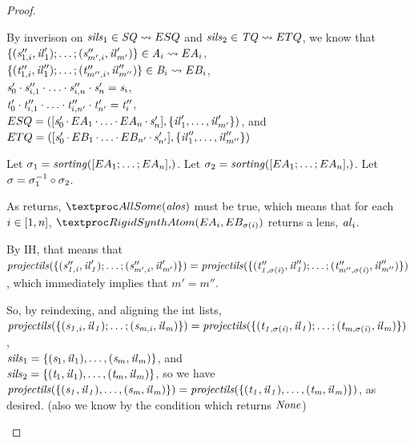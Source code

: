 \documentclass[acmsmall]{acmart}
\begin{document}
\begin{proof}
\begin{case}[sequence]
    By inverison on 
    $\mathit{sils}_1 \in \mathit{SQ} \rightsquigarrow ESQ$ and
    $\mathit{sils}_2 \in \mathit{TQ} \rightsquigarrow ETQ$,
    we know that\\
    $\{(\mathit{s}_{1,i}'',\mathit{il}_1');\ldots;(\mathit{s}_{m',i}'',\mathit{il}_{m'}')\}
    \in \mathit{A}_i \rightsquigarrow EA_i$,\\
    $\{(\mathit{t}_{1,i}'',\mathit{il}_1'');\ldots;(\mathit{t}_{m'',i}'',\mathit{il}_{m''}'')\}
    \in \mathit{B}_i \rightsquigarrow EB_i$,\\
    $\mathit{s}_0'\cdot\mathit{s}_{i,1}''\cdot\ldots\cdot\mathit{s}_{i,n}''\cdot\mathit{s}_n' = \mathit{s}_i$,\\
    $\mathit{t}_0'\cdot\mathit{t}_{i,1}''\cdot\ldots\cdot\mathit{t}_{i,n'}''\cdot\mathit{t}_{n'}' = \mathit{t}_i''$,\\
    $ESQ =
    ([\mathit{s}_0' \mkern-1mu\cdot\mkern-1mu EA_1 \mkern-1mu\cdot\mkern-1mu \ldots \mkern-1mu\cdot\mkern-1mu
      EA_n \mkern-1mu\cdot\mkern-1mu \mathit{s}_n'],\{\mathit{il}_1',\ldots,\mathit{il}_{m'}'\})$, and\\
    $ETQ =
    ([\mathit{s}_0' \mkern-1mu\cdot\mkern-1mu EB_{1} \mkern-1mu\cdot\mkern-1mu \ldots \mkern-1mu\cdot\mkern-1mu
      EB_{n'} \mkern-1mu\cdot\mkern-1mu \mathit{s}_{n'}'],\{\mathit{il}_1'',\ldots,\mathit{il}_{m''}''\})$

    Let $\sigma_1 =
    \SortingOf{\ListOf{\ExampledAtom_1;\ldots;\ExampledAtom_n}}$.
    Let $\sigma_2 =
    \SortingOf{\ListOf{\ExampledAtom_1;\ldots;\ExampledAtom_n}}$.
    Let $\sigma = \sigma_1^{-1} \circ \sigma_2$.

    As \RigidSynthSequence{} returns, $\PCF{AllSome}(\mathit{alos})$ must be true, which
    means that for each $i\in[1,n]$,
    $\RigidSynthAtom(\ExampledAtom_i,\ExampledAtomAlt_{\sigma(i)})$ returns a
    lens, $\mathit{al}_i$.
    
    By IH, that means that
    $\mathit{\mathit{projectils}(\{(\mathit{s}_{1,i}'',\mathit{il}_1');\ldots;(\mathit{s}_{m',i}'',\mathit{il}_{m'}')\})}
    =
    \mathit{\mathit{projectils}(\{(\mathit{t}_{1,\sigma(i)}'',\mathit{il}_1'');\ldots;(\mathit{t}_{m'',\sigma(i)}'',\mathit{il}_{m''}'')\})}$,
    which immediately implies that $m' = m''$.
    
    So, by reindexing, and aligning the int lists, 
    $\mathit{\mathit{projectils}(\{(\mathit{s}_{1,i},\mathit{il}_1);\ldots;(\mathit{s}_{m,i},\mathit{il}_{m})\})}
    =
    \mathit{\mathit{projectils}(\{(\mathit{t}_{1,\sigma(i)},\mathit{il}_1);\ldots;(\mathit{t}_{m,\sigma(i)},\mathit{il}_{m})\})}$,\\
    $\mathit{sils}_1 =
    \{(\mathit{s}_1,\mathit{il}_1),\ldots,(\mathit{s}_m,\mathit{il}_{m})\}$, and\\
    $\mathit{sils}_2 =
    \{(\mathit{t}_1,\mathit{il}_1),\ldots,(\mathit{t}_m,\mathit{il}_{m})\}$, so we
    have
    $\mathit{\mathit{projectils}(\{(\mathit{s}_1,\mathit{il}_1),\ldots,(\mathit{s}_m,\mathit{il}_{m})\})}
    =
    \mathit{\mathit{projectils}(\{(\mathit{t}_1,\mathit{il}_1),\ldots,(\mathit{t}_m,\mathit{il}_{m})\})}$,
    as desired. (also we know by the condition which returns $\mathit{None}$)


\end{case}
\end{proof}
\end{document}
